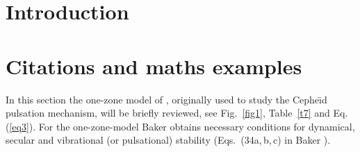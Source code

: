 \documentclass{aa}
\begin{document}
   \maketitle


\section{Introduction}
\lipsum[1]
\section{Citations and maths examples}

   In this section the one-zone model of \citet{baker},
   originally used to study the Cephe{\"{\i}}d pulsation mechanism, will
   be briefly reviewed, see Fig.~\ref{fig1}, Table~\ref{t7} and Eq. (\ref{eq3}).
   For the one-zone-model Baker obtains necessary conditions
   for dynamical, secular and vibrational (or pulsational)
   stability (Eqs.\ (34a,\,b,\,c) in Baker \citeyear{baker}).
   
\end{document}
